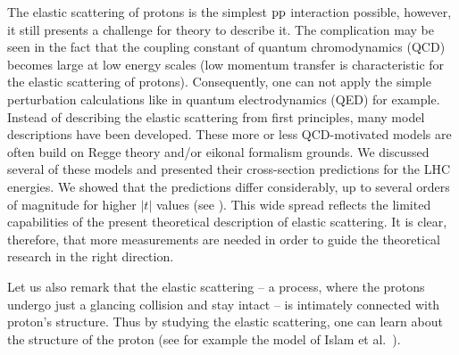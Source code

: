 The elastic scattering of protons is the simplest $\rm pp$ interaction possible, however, it still presents a challenge for theory to describe it. The complication may be seen in the fact that the coupling constant of quantum chromodynamics (QCD) becomes large at low energy scales (low momentum transfer is characteristic for the elastic scattering of protons). Consequently, one can not apply the simple perturbation calculations like in quantum electrodynamics (QED) for example. Instead of describing the elastic scattering from first principles, many model descriptions have been developed. These more or less QCD-motivated models are often build on Regge theory and/or eikonal formalism grounds. We discussed several of these models and presented their cross-section predictions for the LHC energies. We showed that the predictions differ considerably, up to several orders of magnitude for higher $|t|$ values (see ). This wide spread reflects the limited capabilities of the present theoretical description of elastic scattering. It is clear, therefore, that more measurements are needed in order to guide the theoretical research in the right direction.

Let us also remark that the elastic scattering -- a process, where the protons undergo just a glancing collision and stay intact -- is intimately connected with proton's structure. Thus by studying the elastic scattering, one can learn about the structure of the proton (see for example the model of Islam et al.~).


